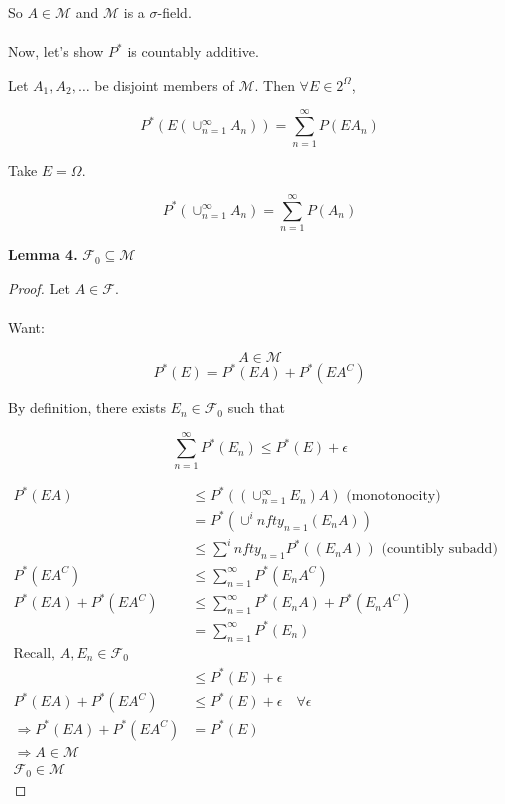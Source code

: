 \documentclass[11pt,fleqn]{book} %
\begin{document}
So $A \in \mathscr{M}$ and $\mathscr{M}$ is a $\sigma$-field. \\
\\

Now, let's show $P^*$ is countably additive.

Let $A_1, A_2, \dots$ be disjoint members of $\mathscr{M}$. Then $\forall E \in 2^\Omega$, 

$$P^*(E(\cup^\infty_{n=1} A_n)) = \displaystyle \sum^\infty_{n=1} P(E A_n) $$

Take $E = \Omega$. 

$$P^*(\cup^\infty_{n=1} A_n) = \displaystyle \sum^\infty_{n=1} P( A_n) $$


\textbf{Lemma 4.} $\mathscr{F}_0 \subseteq \mathscr{M}$

\begin{proof}
	Let $A \in \mathscr{F}$.\\
	\\

	Want:

	$$A \in \mathscr{M} $$
$$P^*(E) = P^*(EA) + P^*(E A^C) $$

By definition, there exists $E_n \in \mathscr{F}_0$ 
such that 

$$\displaystyle \sum^\infty_{n=1} P^*(E_n) \leq P^*(E) + \epsilon $$

$\begin{aligned}
	P^*(EA) &\leq P^*((\cup^\infty_{n=1} E_n)A) \text{ (monotonocity)}\\
		&= P^* (\cup^infty_{n=1} (E_n A))\\
		&\leq \displaystyle \sum^infty_{n=1}P^* ( (E_n A)) \text{ (countibly subadd)}\\
	P^*(E A^C) &\leq \displaystyle \sum^\infty_{n=1} P^*(E_n A^C)\\
	P^*(EA) + P^*(E A^C) &\leq 	\displaystyle \sum^\infty_{n=1} P^*(E_n A) + P^*(E_n A^C)\\
		&= \displaystyle \sum^\infty_{n=1} P^*(E_n)\\
	\text{Recall, } A, E_n \in \mathscr{F}_0\\
		&\leq P^*(E) + \epsilon\\
	P^*(EA) + P^*(E A^C) & \leq P^*(E) + \epsilon \quad \forall \epsilon\\
	\Rightarrow P^*(EA) + P^*(EA^C) &= P^*(E)\\
	\Rightarrow A \in \mathscr{M}\\
	\mathscr{F}_0 \in \mathscr{M}
\end{aligned}$
 
\end{proof}
\end{document}

